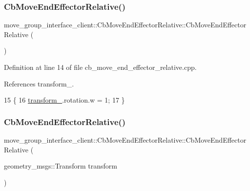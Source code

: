\subsubsection{\texorpdfstring{Cb\+Move\+End\+Effector\+Relative()}{CbMoveEndEffectorRelative()}\hspace{0.1cm}{\footnotesize\ttfamily [1/2]}}
{\footnotesize\ttfamily move\+\_\+group\+\_\+interface\+\_\+client\+::\+Cb\+Move\+End\+Effector\+Relative\+::\+Cb\+Move\+End\+Effector\+Relative (\begin{DoxyParamCaption}{ }\end{DoxyParamCaption})}



Definition at line 14 of file cb\+\_\+move\+\_\+end\+\_\+effector\+\_\+relative.\+cpp.



References transform\+\_\+.


\begin{DoxyCode}
15 \{
16     \hyperlink{classmove__group__interface__client_1_1CbMoveEndEffectorRelative_a180b4e40316bc8d8d578c98b2fac068f}{transform\_}.rotation.w = 1;
17 \}
\end{DoxyCode}
\mbox{\label{classmove__group__interface__client_1_1CbMoveEndEffectorRelative_acd4b8a675f6f1d93dd342ed8a6570da8}} 
\subsubsection{\texorpdfstring{Cb\+Move\+End\+Effector\+Relative()}{CbMoveEndEffectorRelative()}\hspace{0.1cm}{\footnotesize\ttfamily [2/2]}}
{\footnotesize\ttfamily move\+\_\+group\+\_\+interface\+\_\+client\+::\+Cb\+Move\+End\+Effector\+Relative\+::\+Cb\+Move\+End\+Effector\+Relative (\begin{DoxyParamCaption}\item[{geometry\+\_\+msgs\+::\+Transform}]{transform }\end{DoxyParamCaption})}



